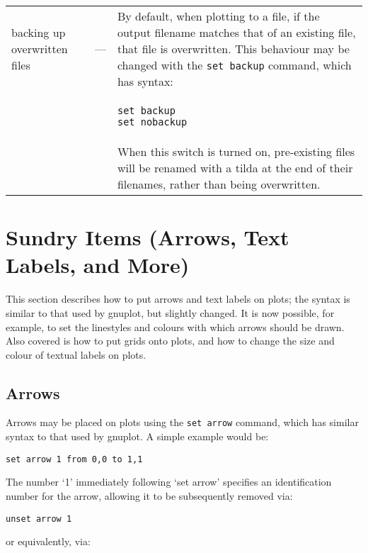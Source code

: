 \documentclass[a4paper,onecolumn,11pt]{book}
\begin{document}
\begin{longtable}{p{3cm}lp{9cm}}
backing up overwritten files\index{set backup command@\texttt{set backup}
command}\index{overwriting files}\index{backup files}\label{filebackup} & ---
& By default, when plotting to a file, if the output filename matches that of
an existing file, that file is overwritten. This behaviour may be changed with
the \texttt{set backup} command, which has syntax:
\\ & &
\begin{verbatim}
set backup
set nobackup
\end{verbatim}
\\ & &
When this switch is turned on, pre-existing files will be renamed with a tilda at the end of their filenames, rather than being overwritten. \\

\end{longtable}

\section{Sundry Items (Arrows, Text Labels, and More)}

This section describes how to put arrows and text labels on plots; the syntax
is similar to that used by gnuplot, but slightly changed. It is now possible,
for example, to set the linestyles and colours with which arrows should be
drawn.  Also covered is how to put grids onto plots, and how to change the size
and colour of textual labels on plots.

\subsection{Arrows}

\label{set_arrow} Arrows may be placed on plots using the \texttt{set arrow} command,
which has similar syntax to that used by gnuplot. A simple example would be:

\begin{verbatim}
set arrow 1 from 0,0 to 1,1
\end{verbatim}

\noindent The number `1' immediately following `set arrow' specifies an identification
number for the arrow, allowing it to be subsequently removed via:

\begin{verbatim}
unset arrow 1
\end{verbatim}

\noindent or equivalently, via:
\end{document}
